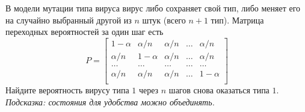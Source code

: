 \documentclass[12pt]{article}
\begin{document}
\begin{exercise}
    В модели мутации типа вируса вирус либо сохраняет свой тип,
    либо меняет его на случайно выбранный другой из $ n $ штук (всего $ n + 1 $ тип).
    Матрица переходных вероятностей за один шаг есть
    \[
        P =
        \begin{bmatrix}
            1 - \alpha & \alpha / n & \alpha / n & \ldots & \alpha / n \\
            \alpha / n & 1 - \alpha & \alpha / n & \ldots & \alpha / n \\
            \ldots     & \ldots     & \ldots     & \ldots & \ldots     \\
            \alpha / n & \alpha / n & \alpha / n & \ldots & 1 - \alpha \\
        \end{bmatrix}
    \]
    Найдите вероятность вирусу типа $ 1 $ через $ n $ шагов снова оказаться типа $ 1 $.
    \textit{Подсказка: состояния для удобства можно объединять.}
\end{exercise}
\end{document}
